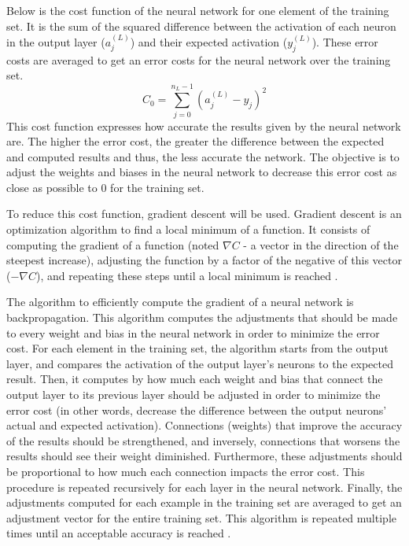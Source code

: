 \documentclass[12pt,a4paper,notitlepage]{article}
\begin{document}
Below is the cost function of the neural network for one element of the training set. It is the sum of the squared difference between the activation of each neuron in the output layer (\(a_{j}^{(L)}\)) and their expected activation (\(y_{j}^{(L)}\)). These error costs are averaged to get an error costs for the neural network over the training set.
\begin{displaymath}
	C_{0} = \sum_{j=0}^{n_{L} - 1} (a_{j}^{(L)} - y_{j})^{2}
\end{displaymath}
This cost function expresses how accurate the results given by the neural network are. The higher the error cost, the greater the difference between the expected and computed results and thus, the less accurate the network. The objective is to adjust the weights and biases in the neural network to decrease this error cost as close as possible to 0 for the training set.

To reduce this cost function, gradient descent will be used. Gradient descent is an optimization algorithm to find a local minimum of a function. It consists of computing the gradient of a function (noted \(\nabla C\) - a vector in the direction of the steepest increase), adjusting the function by a factor of the negative of this vector (\(-\nabla C\)), and repeating these steps until a local minimum is reached \cite{sanderson_gradient_2017}.

The algorithm to efficiently compute the gradient of a neural network is backpropagation. This algorithm computes the adjustments that should be made to every weight and bias in the neural network in order to minimize the error cost. For each element in the training set, the algorithm starts from the output layer, and compares the activation of the output layer's neurons to the expected result. Then, it computes by how much each weight and bias that connect the output layer to its previous layer should be adjusted in order to minimize the error cost (in other words, decrease the difference between the output neurons' actual and expected activation). Connections (weights) that improve the accuracy of the results should be strengthened, and inversely, connections that worsens the results should see their weight diminished. Furthermore, these adjustments should be proportional to how much each connection impacts the error cost. This procedure is repeated recursively for each layer in the neural network. Finally, the adjustments computed for each example in the training set are averaged to get an adjustment vector for the entire training set. This algorithm is repeated multiple times until an acceptable accuracy is reached \cite{sanderson_gradient_2017}.
\end{document}
